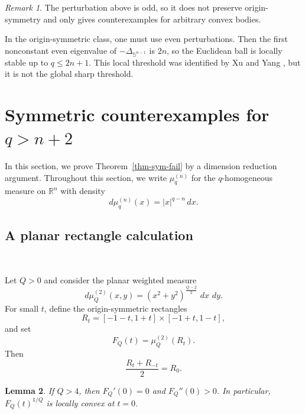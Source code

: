 \documentclass[12pt,leqno]{amsart}
\theoremstyle{plain} \newtheorem{thm}{Theorem}[section]
\theoremstyle{plain} \newtheorem{prop}[thm]{Proposition}
\theoremstyle{plain} \newtheorem{prob}[thm]{Problem}
\theoremstyle{definition} \newtheorem{defi}[thm]{Definition}
\theoremstyle{plain} \newtheorem{cor}[thm]{Corollary}
\theoremstyle{plain} \newtheorem{lem}[thm]{Lemma}
\theoremstyle{plain} \newtheorem{eg}{Example}[section]
\theoremstyle{remark} \newtheorem{rmk}[thm]{Remark}
\theoremstyle{plain} \newtheorem{conj}{Conjecture}
\numberwithin{equation}{section}
\newcommand{\bS}{\mathbb{S}}
\newcommand{\dd}{\,d}
\newcommand{\R}{\mathbb{R}}
\begin{document}
\begin{rmk}
The perturbation above is odd, so it does not preserve origin-symmetry and only gives counterexamples for arbitrary convex bodies.

In the origin-symmetric class, one must use even perturbations. Then the first nonconstant even eigenvalue of $-\Delta_{\bS^{n-1}}$ is $2n$, so the Euclidean ball is locally stable up to $q\le 2n+1$. This local threshold was identified by Xu and Yang \cite{XY26}, but it is not the global sharp threshold.
\end{rmk}


\section{Symmetric counterexamples for $q>n+2$}\label{sec-4}

In this section, we prove Theorem~\ref{thm-sym-fail} by a dimension reduction argument. Throughout this section, we write $\mu_q^{(n)}$ for the $q$-homogeneous measure on $\R^n$ with density
\[
    d\mu_q^{(n)}(x)=|x|^{q-n}\dd x.
\]

\subsection{A planar rectangle calculation}\

Let $Q>0$ and consider the planar weighted measure
\[
    d\mu_Q^{(2)}(x,y)=(x^2+y^2)^{\frac{Q-2}{2}}\,\dd x\,\dd y.
\]
For small $t$, define the origin-symmetric rectangles
\[
    R_t=[-1-t,1+t]\times[-1+t,1-t],
\]
and set
\[
    F_Q(t)=\mu_Q^{(2)}(R_t).
\]
Then
\[
    \frac{R_t+R_{-t}}{2}=R_0.
\]

\begin{lem}\label{lem-planar-rectangle}
If $Q>4$, then $F_Q'(0)=0$ and $F_Q''(0)>0$. In particular, $F_Q(t)^{1/Q}$ is locally convex at $t=0$.
\end{lem}
\end{document}
